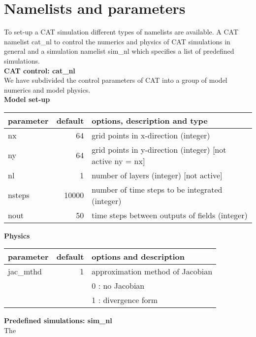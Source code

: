 \chapter{Namelists and parameters}
To set-up a CAT simulation different types of namelists are available. 
A CAT namelist cat{\_}nl to control the numerics and physics of CAT
simulations in general and a simulation namelist sim{\_}nl which specifies 
a list of predefined simulations.\\ 

\noindent
{\bf \Large CAT control: cat{\_}nl} \\
\noindent
We have subdivided the control parameters of CAT into a group of model
numerics and model physics. \\

\noindent
{\bf Model set-up} \\ 
\noindent
\begin{tabular}{|l|r|l|}
 \hline
 parameter & default & options, description and type \\
 \hline
 nx      &   64       & grid points in x-direction (integer) \\
 ny      &   64       & grid points in y-direction (integer) [not active ny = nx] \\
 nl      &   1        & number of layers (integer) [not active]  \\
 nsteps  &   10000    & number of time steps to be integrated (integer) \\
 nout    &   50       & time steps between outputs of fields (integer) \\
 \hline
\end{tabular} 

\vspace{0.5cm}

\noindent
{\bf Physics} \\ 
\noindent
\begin{tabular}{|l|r|l|}
 \hline
 parameter & default & options and description \\
 \hline
 jac{\_}mthd  &  1       & approximation method of Jacobian  \\
              &          & 0 : no Jacobian  \\
              &          & 1 : divergence form \\
 \hline
\end{tabular}

\vspace{0.5cm}
\noindent
{\bf \Large Predefined simulations: sim{\_}nl} \\
The  

